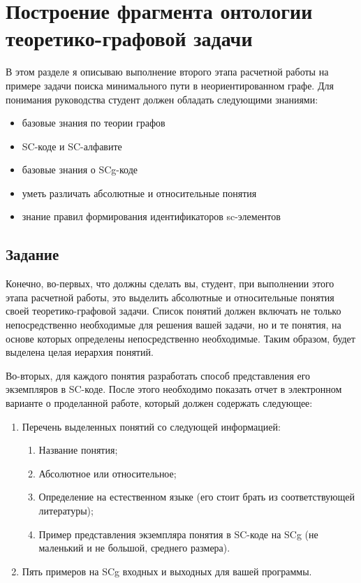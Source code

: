 
\chapter{Построение фрагмента онтологии теоретико-графовой задачи}
\label{cha:Graph_onto}

В этом разделе я описываю выполнение второго этапа расчетной
работы на примере задачи поиска минимального пути в неориентированном
графе. Для понимания руководства студент должен обладать следующими
знаниями: 

\begin{itemize}
\item базовые знания по теории графов
\item SC-коде и SC-алфавите
\item базовые знания о SCg-коде
\item уметь различать абсолютные и относительные понятия
\item знание правил формирования идентификаторов sc-элементов
\end{itemize}

\section{Задание}

Конечно, во-первых, что должны сделать вы, студент, при выполнении
этого этапа расчетной работы, это выделить абсолютные и относительные
понятия своей теоретико-графовой задачи. Список понятий должен
включать не только непосредственно необходимые для решения вашей
задачи, но и те понятия, на основе которых определены непосредственно
необходимые. Таким образом, будет выделена целая иерархия понятий.

Во-вторых, для каждого понятия разработать способ представления его
экземпляров в SC-коде. После этого необходимо показать отчет в
электронном варианте о проделанной работе, который должен содержать
следующее:

\begin{enumerate}
\item Перечень выделенных понятий со следующей информацией:
  \begin{enumerate}
  \item Название понятия;
  \item Абсолютное или относительное;
  \item Определение на естественном языке (его стоит брать из соответствующей
    литературы);
  \item Пример представления экземпляра понятия в SC-коде на
    SCg (не маленький и не большой, среднего размера). 
  \end{enumerate}
\item Пять примеров на SCg входных и выходных для вашей программы. 
\end{enumerate}

